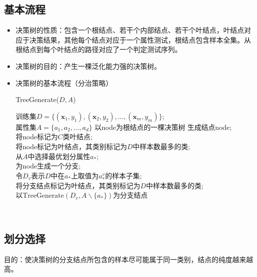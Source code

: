 \documentclass{ctexart}
\begin{document}
				\subsection{基本流程}
					\begin{itemize}
						\item 决策树的性质：包含一个根结点、若干个内部结点、若干个叶结点，叶结点对应于决策结果，其他每个结点对应于一个属性测试，根结点包含样本全集。从根结点到每个叶结点的路径对应了一个判定测试序列。
						\item 决策树的目的：产生一棵泛化能力强的决策树。
						\item 决策树的基本流程（分治策略）
						\begin{algorithm}
							\caption{TreeGenerate($D,A$)}
							\begin{algorithmic}[1]
								\REQUIRE 训练集$D=\{(\bm{x}_1,y_1),(\bm{x}_2,y_2),\dots,(\bm{x}_m,y_m)\}$;\\属性集$A=\{a_1,a_2,\dots,a_d\}$
								\ENSURE 以node为根结点的一棵决策树
								\STATE 生成结点node; \\
								\STATE 将node标记为$C$类叶结点;\\
								\RETURN
								\ENDIF
								\STATE 将node标记为叶结点，其类别标记为$D$中样本数最多的类;\\
								\RETURN
								\ENDIF
								\STATE 从$A$中选择最优划分属性$a_*$;\\
								\STATE 为node生成一个分支;\\
								\STATE 令$D_v$表示$D$中在$a_*$上取值为$a_*^v$的样本子集;\\
								\STATE 将分支结点标记为叶结点，其类别标记为$D$中样本数最多的类;\\
								\RETURN
								\ELSE
								\STATE 以$\mathrm{TreeGenerate}(D_v,A\backslash\{a_*\})$为分支结点\\
								\ENDIF
								\ENDFOR
							\end{algorithmic} 
						\end{algorithm}
					\end{itemize}
				\subsection{划分选择}
					
					目的：使决策树的分支结点所包含的样本尽可能属于同一类别，结点的纯度越来越高。
\end{document}
